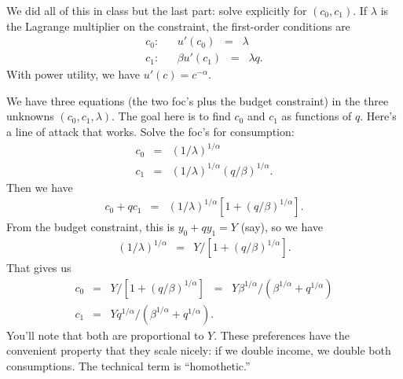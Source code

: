 \documentclass[11pt]{exam}
\begin{document}
\begin{questions}

\begin{solution}
We did all of this in class but the last part:  
solve explicitly for $(c_0,c_1)$. 
If $\lambda$ is the Lagrange multiplier on the constraint, 
the first-order conditions are 
\begin{eqnarray*}
    c_0:&&  u'(c_0) \;\;=\;\; \lambda \\
    c_1:&&  \beta u'(c_1) \;\;=\;\; \lambda q.
\end{eqnarray*}
With power utility, we have $u'(c) = c^{-\alpha}$.

We have three equations (the two foc's plus the budget constraint)
in the three unknowns $(c_0,c_1,\lambda)$.  
The goal here is to find $c_0$ and $c_1$ as functions of $q$.
Here's a line of attack that works.  
Solve the foc's for consumption:  
\begin{eqnarray*}
    c_0 &=& (1/\lambda)^{1/\alpha} \\
    c_1 &=& (1/\lambda)^{1/\alpha} (q/\beta)^{1/\alpha} .
\end{eqnarray*}
Then we have 
\begin{eqnarray*}
    c_0 + q c_1 &=& (1/\lambda)^{1/\alpha} \left[ 1 + (q/\beta)^{1/\alpha} \right] .
\end{eqnarray*}
From the budget constraint, this is $y_0 + q y_1 = Y$ (say), 
so we have 
\begin{eqnarray*}
    (1/\lambda)^{1/\alpha} &=&  {Y}/[1 + (q/\beta)^{1/\alpha} ].
\end{eqnarray*}
That gives us 
\begin{eqnarray*}
    c_0 &=& {Y}/[1 + (q/\beta)^{1/\alpha} ] \;\;=\;\; {Y}\beta^{1/\alpha} /(\beta^{1/\alpha} + q^{1/\alpha}  ) \\
    c_1 &=& {Y}q^{1/\alpha}/(\beta^{1/\alpha} + q^{1/\alpha} ) .
\end{eqnarray*}
You'll note that both are proportional to $Y$.
These preferences have the convenient property that they scale nicely:
if we double income, we double both consumptions.  
The technical term is ``homothetic.''




\end{solution}
\end{questions}
\end{document}
